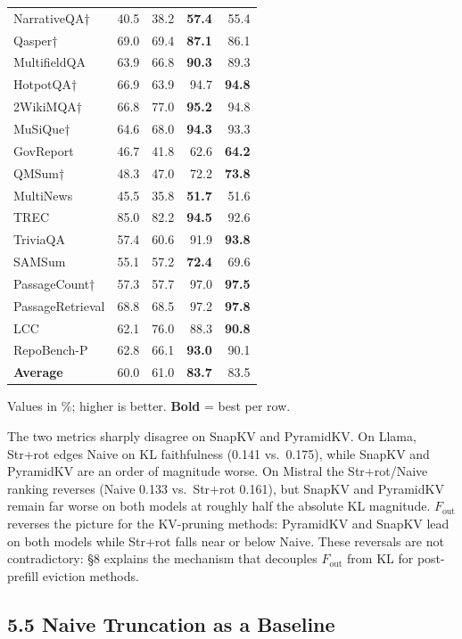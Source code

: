 \documentclass[10pt,letterpaper]{article}
\begin{document}
\begin{table}[H]
\begin{minipage}[t]{0.49\textwidth}
\begin{tabular}{@{}lrrrr@{}}
\midrule
NarrativeQA† & 40.5 & 38.2 & \textbf{57.4} & 55.4\\
Qasper† & 69.0 & 69.4 & \textbf{87.1} & 86.1\\
MultifieldQA & 63.9 & 66.8 & \textbf{90.3} & 89.3\\
HotpotQA† & 66.9 & 63.9 & 94.7 & \textbf{94.8}\\
2WikiMQA† & 66.8 & 77.0 & \textbf{95.2} & 94.8\\
MuSiQue† & 64.6 & 68.0 & \textbf{94.3} & 93.3\\
GovReport & 46.7 & 41.8 & 62.6 & \textbf{64.2}\\
QMSum† & 48.3 & 47.0 & 72.2 & \textbf{73.8}\\
MultiNews & 45.5 & 35.8 & \textbf{51.7} & 51.6\\
TREC & 85.0 & 82.2 & \textbf{94.5} & 92.6\\
TriviaQA & 57.4 & 60.6 & 91.9 & \textbf{93.8}\\
SAMSum & 55.1 & 57.2 & \textbf{72.4} & 69.6\\
PassageCount† & 57.3 & 57.7 & 97.0 & \textbf{97.5}\\
PassageRetrieval & 68.8 & 68.5 & 97.2 & \textbf{97.8}\\
LCC & 62.1 & 76.0 & 88.3 & \textbf{90.8}\\
RepoBench-P & 62.8 & 66.1 & \textbf{93.0} & 90.1\\
\midrule
\textbf{Average} & 60.0 & 61.0 & \textbf{83.7} & 83.5\\
\bottomrule
\end{tabular}
\end{minipage}
\par\smallskip
\center Values in \%; higher is better. \textbf{Bold} = best per row.
\end{table}

The two metrics sharply disagree on SnapKV and PyramidKV.
On Llama, Str+rot edges Naive on KL faithfulness (0.141 vs.\ 0.175),
while SnapKV and PyramidKV are an order of magnitude worse. On Mistral
the Str+rot/Naive ranking reverses (Naive 0.133 vs.\ Str+rot 0.161),
but SnapKV and PyramidKV remain far worse on both models at roughly half
the absolute KL magnitude. \(F_{\text{out}}\) reverses the picture for
the KV-pruning methods: PyramidKV and SnapKV lead on both models while
Str+rot falls near or below Naive. These reversals are not
contradictory: §8 explains the mechanism that decouples
\(F_{\text{out}}\) from KL for post-prefill eviction methods.

\hypertarget{naive-truncation-as-a-baseline}{%
\subsection{5.5 Naive Truncation as a
Baseline}\label{naive-truncation-as-a-baseline}}
\end{document}
